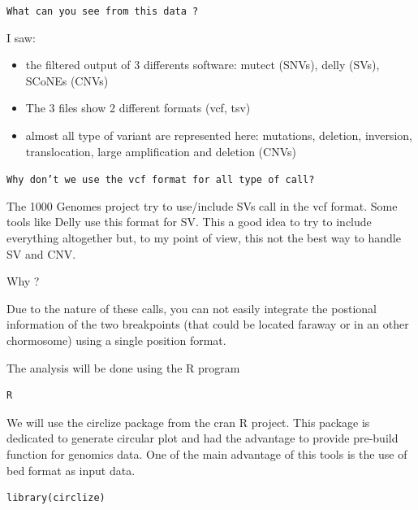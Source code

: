 \begin{question}
\texttt{What can you see from this data ?}
\end{question}


\begin{answer}
I saw:
\begin{itemize}
  \item the filtered output of 3 differents software: mutect (SNVs), delly (SVs), SCoNEs (CNVs)
  \item The 3 files show 2 different formats (vcf, tsv)
  \item almost all type of variant are represented here: mutations, deletion, inversion, translocation, large amplification and deletion (CNVs)
\end{itemize}
\end{answer}




\begin{question}
\texttt{Why don't we use the vcf format for all type of call?}
\end{question}


\begin{answer}
The 1000 Genomes project try to use/include SVs call in the vcf format. Some tools like Delly use this format for SV. This a good idea to try to include everything altogether but, to my point of view, this not the best way to handle SV and CNV. 

Why ?

Due to the nature of these calls, you can not easily integrate the postional information of the two breakpoints (that could be located faraway or in an other chormosome) using a single position format.
\end{answer}



The analysis will be done using the R program

\begin{steps}
\begin{lstlisting}
R
\end{lstlisting}
\end{steps}

We will use the circlize package from the cran R project. This package is dedicated to generate circular plot and had the advantage to provide pre-build function for genomics data. One of the main advantage of this tools is the use of bed format as input data.

\begin{steps}
\begin{lstlisting}
library(circlize)
\end{lstlisting}
\end{steps}


